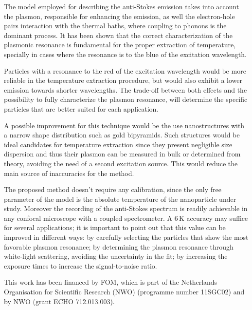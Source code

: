 \documentclass[journal=nalefd,manuscript=letter]{achemso}
\newcommand{\K}{\ensuremath{\,\textrm{K}}}
\begin{document}
The model employed for describing the anti-Stokes emission takes into account
the plasmon, responsible for enhancing the emission, as well the electron-hole pairs
interaction with the thermal baths, where coupling to phonons is the dominant process.
It has been shown that the correct characterization of the plasmonic resonance is
fundamental for the proper extraction of temperature, specially in cases
where the resonance is to the blue of the excitation wavelength.

Particles with a resonance to the red of the excitation wavelength would be more
reliable in the temperature extraction procedure, but would also exhibit a lower
emission towards shorter wavelengths. The trade-off between both effects and
the possibility to fully characterize the plasmon resonance, will determine the
specific particles that are better suited for each application.

A possible improvement for this technique would be the use nanostructures with a
narrow shape distribution such as gold bipyramids\cite{Pelton2009}. Such
structures would be ideal candidates for temperature extraction since they
present negligible size dispersion and thus their plasmon can be measured in
bulk or determined from theory, avoiding the need of a second excitation source.
This would reduce the main source of inaccuracies for the method.

The proposed method doesn't require any calibration, since the only free
parameter of the model is the absolute temperature of the nanoparticle under
study. Moreover the recording of the anti-Stokes spectrum is readily achievable
in any confocal microscope with a coupled spectrometer. A $6\K$ accuracy may
suffice for several applications; it is important to point out that this value
can be improved in different ways: by carefully selecting the particles that
show the most favorable plasmon resonance; by determining the plasmon resonance
through white-light scattering, avoiding the uncertainty in the fit; by
increasing the exposure times to increase the signal-to-noise ratio.

\begin{acknowledgement}
This work has been financed by FOM, which is part of the Netherlands Organisation for Scientific Research (NWO)
(programme number 11SGC02) and by NWO (grant ECHO 712.013.003). 
\end{acknowledgement}
\end{document}
